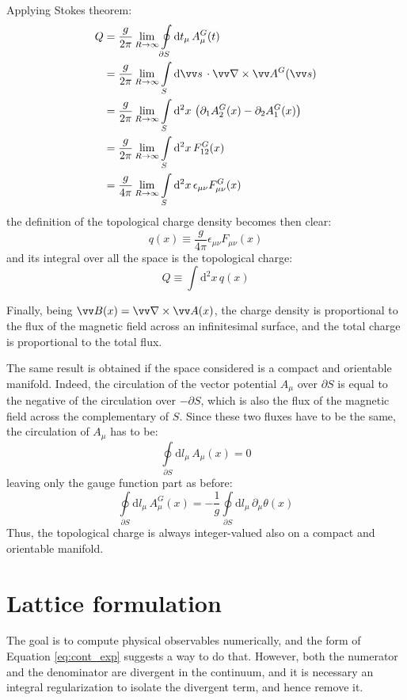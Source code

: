 Applying Stokes theorem:
\begin{align*}
    Q &= \frac{g}{2\pi}\lim_{R\to\infty}\oint\limits_{\partial S}\mathrm dt_\mu\,A^G_\mu(t) \\
      &= \frac{g}{2\pi}\lim_{R\to\infty}\int\limits_S\mathrm d\vv s\,\cdot \vv\nabla \times \vv A^G(\vv s) \\
      &= \frac{g}{2\pi}\lim_{R\to\infty}\int\limits_S\mathrm d^2x\, \left(\partial_1 A^G_2(x) - \partial_2 A^G_1(x)\right) \\
      &= \frac{g}{2\pi}\lim_{R\to\infty}\int\limits_S\mathrm d^2x\, F^G_{12}(x) \\
      &= \frac{g}{4\pi}\lim_{R\to\infty}\int\limits_S\mathrm d^2x\, \epsilon_{\mu\nu}F^G_{\mu\nu}(x)
\end{align*}
the definition of the topological charge density becomes then clear:
\begin{equation}\label{eq:top_charge_density}
    q(x) \equiv \frac{g}{4\pi}\epsilon_{\mu\nu}F_{\mu\nu}(x)
\end{equation}
and its integral over all the space is the topological charge:
\begin{equation}\label{eq:top_charge}
    Q \equiv \int\mathrm d^2x\,q(x)
\end{equation}

Finally, being $\vv B(x) = \vv\nabla \times \vv A(x)$, the charge density is proportional to the flux of the magnetic field across an infinitesimal surface,
and the total charge is proportional to the total flux.

The same result is obtained if the space considered is a compact and orientable manifold.
Indeed, the circulation of the vector potential $A_\mu$ over $\partial S$ is equal to the negative of the circulation over $-\partial S$,
which is also the flux of the magnetic field across the complementary of $S$.
Since these two fluxes have to be the same, the circulation of $A_\mu$ has to be:
\[
    \oint\limits_{\partial S}\mathrm dl_\mu\,A_\mu(x) = 0
\]
leaving only the gauge function part as before:
\[
    \oint\limits_{\partial S}\mathrm dl_\mu\,A_\mu^G(x) = -\frac{1}{g}\oint\limits_{\partial S}\mathrm dl_\mu\,\partial_\mu\theta(x)
\]
Thus, the topological charge is always integer-valued also on a compact and orientable manifold.

\section{Lattice formulation}
The goal is to compute physical observables numerically, and the form of Equation \eqref{eq:cont_exp} suggests a way to do that.
However, both the numerator and the denominator are divergent in the continuum, and it is necessary an integral regularization to isolate the divergent term,
and hence remove it.

